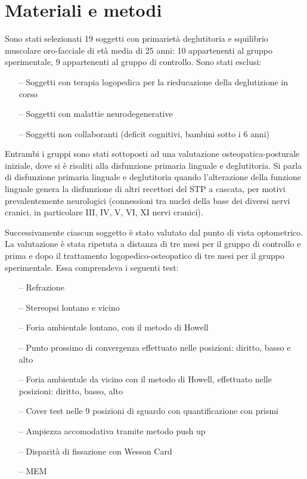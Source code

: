 \section{Materiali e metodi}

Sono stati selezionati 19 soggetti con primarietà deglutitoria e squilibrio muscolare oro-facciale di età media di 25 anni:
10 appartenenti al gruppo sperimentale, 9 appartenenti al gruppo di controllo. Sono stati esclusi:

\begin{itemize}
 \itemsep-0.5em
 \item[--]Soggetti con terapia logopedica per la rieducazione della deglutizione in corso
 \item[--]Soggetti con malattie neurodegenerative
 \item[--]Soggetti non collaboranti (deficit cognitivi, bambini sotto i 6 anni)
\end{itemize}

Entrambi i gruppi sono stati sottoposti ad una valutazione osteopatica-posturale iniziale, dove si è risaliti alla
disfunzione primaria linguale e deglutitoria. Si parla di disfunzione primaria linguale e deglutitoria quando l’alterazione
della funzione linguale genera la disfunzione di altri recettori del STP a cascata, per motivi prevalentemente neurologici
(connessioni tra nuclei della base dei diversi nervi cranici, in particolare III, IV, V, VI, XI nervi cranici).

Successivamente ciascun soggetto è stato valutato dal punto di vista optometrico. La valutazione è stata ripetuta a
distanza di tre mesi per il gruppo di controllo e prima e dopo il trattamento logopedico-osteopatico di tre mesi per il
gruppo sperimentale. Essa comprendeva i seguenti test:

\begin{itemize}
 \itemsep-0.5em
 \item[--]Refrazione
 \item[--]Stereopsi lontano e vicino
 \item[--]Foria ambientale lontano, con il metodo di Howell
 \item[--]Punto prossimo di convergenza effettuato nelle posizioni: diritto, basso e alto
 \item[--]Foria ambientale da vicino con il metodo di Howell, effettuato nelle posizioni: diritto, basso, alto
 \item[--]Cover test nelle 9 posizioni di sguardo con quantificazione con prismi
 \item[--]Ampiezza accomodativa tramite metodo push up
 \item[--]Disparità di fissazione con Wesson Card
 \item[--]MEM
 \end{itemize}
 

